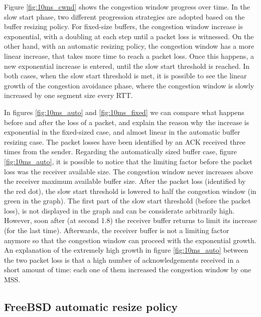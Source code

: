 \documentclass[a4paper,10pt]{article}
\begin{document}
Figure \ref{fig:10ms_cwnd} shows the congestion window progress over time. In the slow start phase, two different progression strategies are adopted based on the buffer resizing policy. For fixed-size buffers, the congestion window increase is exponential, with a doubling at each step until a packet loss is witnessed. On the other hand, with an automatic resizing policy, the congestion window has a more linear increase, that takes more time to reach a packet loss. Once this happens, a new exponential increase is entered, until the slow start threshold is reached.
In both cases, when the slow start threshold is met, it is possible to see the linear growth of the congestion avoidance phase, where the congestion window is slowly increased by one segment size every RTT.

In figures \ref{fig:10ms_auto} and \ref{fig:10ms_fixed} we can compare what happens before and after the loss of a packet, and explain the reason why the increase is exponential in the fixed-sized case, and almost linear in the automatic buffer resizing case. 
The packet losses have been identified by an ACK received three times from the sender. 
Regarding the automatically sized buffer case, figure \ref{fig:10ms_auto}, it is possible to notice that the limiting factor before the packet loss was the receiver available size. The congestion window never increases above the receiver maximum available buffer size. After the packet loss (identified by the red dot), the slow start threshold is lowered to half the congestion window (in green in the graph). The first part of the slow start threshold (before the packet loss), is not displayed in the graph and can be considerate arbitrarily high. However, soon after (at second 1.8) the receiver buffer returns to limit its increase (for the last time). Afterwards, the receiver buffer is not a limiting factor anymore so that the congestion window can proceed with the exponential growth.
An explanation of the extremely high growth in figure \ref{fig:10ms_auto} between the two packet loss is that a high number of acknowledgements received in a short amount of time: each one of them increased the congestion window by one MSS.

\subsection{FreeBSD automatic resize policy}
\end{document}
